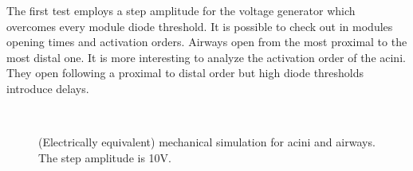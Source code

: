 The first test employs a step amplitude for the voltage generator which
overcomes every module diode threshold.  It is possible to check out in
 modules
opening times and activation orders.  Airways open from the most
proximal to the most distal one.  It is more interesting to analyze
the activation order of the acini.  They open following a proximal
to distal order but high diode thresholds introduce delays.

\vspace{2.25em}

\begin{figure}[H]\centering
  \hspace{1cm}
  \\
  \hspace{1cm}
  \caption{(Electrically equivalent) mechanical simulation for acini
    and airways.  The step amplitude is 10V.}
  \label{fig:mechanical_results_10_2}
\end{figure}

